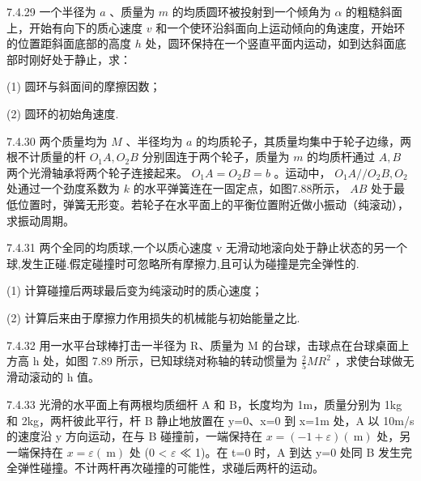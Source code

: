 \begin{problem}{7.4.29}
一个半径为 $a$ 、质量为 $m$ 的均质圆环被投射到一个倾角为 $\alpha$ 的粗糙斜面上，开始有向下的质心速度 $v$ 和一个使环沿斜面向上运动倾向的角速度，开始环的位置距斜面底部的高度 $h$ 处，圆环保持在一个竖直平面内运动，如到达斜面底部时刚好处于静止，求：

(1) 圆环与斜面间的摩擦因数；

(2) 圆环的初始角速度.
\end{problem}
\clearpage


\begin{problem}{7.4.30}
两个质量均为 $M$ 、半径均为 $a$ 的均质轮子，其质量均集中于轮子边缘，两根不计质量的杆 $O_{1}A, O_{2}B$ 分别固连于两个轮子，质量为 $m$ 的均质杆通过 $A, B$ 两个光滑轴承将两个轮子连接起来。 $O_{1}A = O_{2}B = b$ 。运动中， $O_{1}A // O_{2}B, O_{2}$ 处通过一个劲度系数为 $k$ 的水平弹簧连在一固定点，如图7.88所示， $AB$ 处于最低位置时，弹簧无形变。若轮子在水平面上的平衡位置附近做小振动（纯滚动），求振动周期。
\begin{center}

\end{center}
\end{problem}
\clearpage


\begin{problem}{7.4.31}
两个全同的均质球,一个以质心速度 v 无滑动地滚向处于静止状态的另一个球,发生正碰.假定碰撞时可忽略所有摩擦力,且可认为碰撞是完全弹性的.

(1) 计算碰撞后两球最后变为纯滚动时的质心速度；

(2) 计算后来由于摩擦力作用损失的机械能与初始能量之比.
\end{problem}
\clearpage


\begin{problem}{7.4.32}
用一水平台球棒打击一半径为 R、质量为 M 的台球，击球点在台球桌面上方高 h 处，如图 7.89 所示，已知球绕对称轴的转动惯量为 $\frac{2}{5}MR^{2}$ ，求使台球做无滑动滚动的 h 值。
\begin{center}

\end{center}
\end{problem}
\clearpage


\begin{problem}{7.4.33}
光滑的水平面上有两根均质细杆 A 和 B，长度均为 1m，质量分别为 1kg 和 2kg，两杆彼此平行，杆 B 静止地放置在 y=0、x=0 到 x=1m 处，A 以 10m/s 的速度沿 y 方向运动，在与 B 碰撞前，一端保持在 $x=(-1+\varepsilon)(\mathrm{~m})$ 处，另一端保持在 $x=\varepsilon(\mathrm{~m})$ 处 (0 < $\varepsilon$ ≪ 1)。在 t=0 时，A 到达 y=0 处同 B 发生完全弹性碰撞。不计两杆再次碰撞的可能性，求碰后两杆的运动。
\begin{center}

\end{center}
\end{problem}
\clearpage


